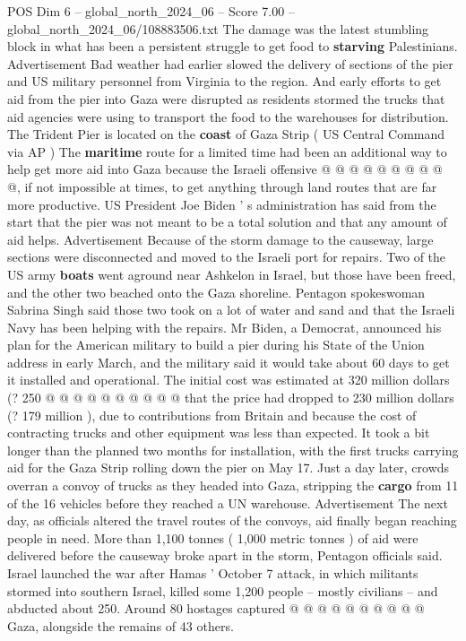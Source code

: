 \begin{textsample}{POS Dim 6 – global\_north\_2024\_06 – Score 7.00 – global\_north\_2024\_06/108883506.txt}
The damage was the latest stumbling block in what has been a persistent struggle to get food to \textbf{starving} Palestinians.
Advertisement Bad weather had earlier slowed the delivery of sections of the pier and US military personnel from Virginia to the region.
And early efforts to get aid from the pier into Gaza were disrupted as residents stormed the trucks that aid agencies were using to transport the food to the warehouses for distribution.
The Trident Pier is located on the \textbf{coast} of Gaza Strip ( US Central Command via AP ) The \textbf{maritime} route for a limited time had been an additional way to help get more aid into Gaza because the Israeli offensive @ @ @ @ @ @ @ @ @ @, if not impossible at times, to get anything through land routes that are far more productive.
US President Joe Biden ' s administration has said from the start that the pier was not meant to be a total solution and that any amount of aid helps.
Advertisement Because of the storm damage to the causeway, large sections were disconnected and moved to the Israeli port for repairs.
Two of the US army \textbf{boats} went aground near Ashkelon in Israel, but those have been freed, and the other two beached onto the Gaza shoreline.
Pentagon spokeswoman Sabrina Singh said those two took on a lot of water and sand and that the Israeli Navy has been helping with the repairs.
Mr Biden, a Democrat, announced his plan for the American military to build a pier during his State of the Union address in early March, and the military said it would take about 60 days to get it installed and operational.
The initial cost was estimated at 320 million dollars (? 250 @ @ @ @ @ @ @ @ @ @ that the price had dropped to 230 million dollars (? 179 million ), due to contributions from Britain and because the cost of contracting trucks and other equipment was less than expected.
It took a bit longer than the planned two months for installation, with the first trucks carrying aid for the Gaza Strip rolling down the pier on May 17.
Just a day later, crowds overran a convoy of trucks as they headed into Gaza, stripping the \textbf{cargo} from 11 of the 16 vehicles before they reached a UN warehouse.
Advertisement The next day, as officials altered the travel routes of the convoys, aid finally began reaching people in need.
More than 1,100 tonnes ( 1,000 metric tonnes ) of aid were delivered before the causeway broke apart in the storm, Pentagon officials said.
Israel launched the war after Hamas ' October 7 attack, in which militants stormed into southern Israel, killed some 1,200 people -- mostly civilians -- and abducted about 250.
Around 80 hostages captured @ @ @ @ @ @ @ @ @ @ Gaza, alongside the remains of 43 others.

\end{textsample}
